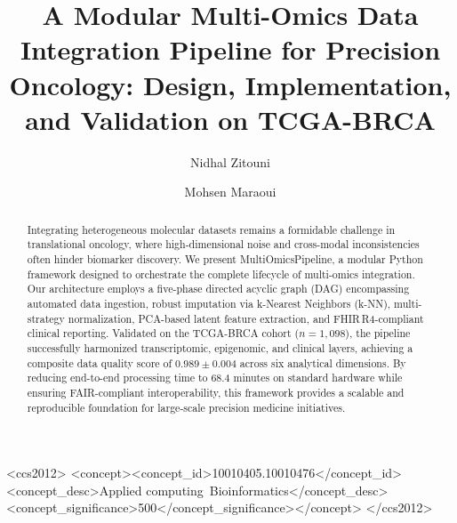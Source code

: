 \documentclass[sigconf,nonacm]{acmart}
\begin{document}
\title{A Modular Multi-Omics Data Integration Pipeline for Precision Oncology: Design, Implementation, and Validation on TCGA-BRCA}

\author{Nidhal Zitouni}

\author{Mohsen Maraoui}

\begin{abstract}
Integrating heterogeneous molecular datasets remains a formidable challenge in translational oncology, where high-dimensional noise and cross-modal inconsistencies often hinder biomarker discovery. We present MultiOmicsPipeline, a modular Python framework designed to orchestrate the complete lifecycle of multi-omics integration. Our architecture employs a five-phase directed acyclic graph (DAG) encompassing automated data ingestion, robust imputation via k-Nearest Neighbors (k-NN), multi-strategy normalization, PCA-based latent feature extraction, and FHIR\,R4-compliant clinical reporting. Validated on the TCGA-BRCA cohort ($n=1,098$), the pipeline successfully harmonized transcriptomic, epigenomic, and clinical layers, achieving a composite data quality score of $0.989\pm0.004$ across six analytical dimensions. By reducing end-to-end processing time to 68.4 minutes on standard hardware while ensuring FAIR-compliant interoperability, this framework provides a scalable and reproducible foundation for large-scale precision medicine initiatives.
\end{abstract}

\begin{CCSXML}
<ccs2012>
<concept><concept_id>10010405.10010476</concept_id>
<concept_desc>Applied computing~Bioinformatics</concept_desc>
<concept_significance>500</concept_significance></concept>
</ccs2012>
\end{CCSXML}


\maketitle

\end{document}
